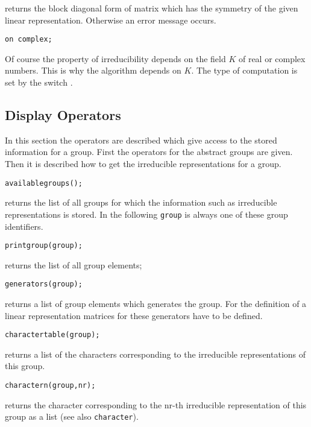 returns the block diagonal form of matrix which has the symmetry
of the given linear representation. Otherwise an error message occurs.

\texttt{on complex;}

Of course the property of irreducibility depends on the field $K$ of
real or complex numbers. This is why the algorithm depends on $K$.
The type of computation is set by the switch .

\subsection{Display Operators}
\hypertarget{operator:AVAILABLEGROUPS}{}
\hypertarget{operator:PRINTGROUP}{}
\hypertarget{operator:GENERATORS}{}
\hypertarget{operator:CHARACTERTABLE}{}
\hypertarget{operator:CHARACTERN}{}
\hypertarget{operator:IRREDUCIBLEREPTABLE}{}
\hypertarget{operator:IRREDUCIBLEREPNR}{}

In this section the operators are described which give access to the
stored information for a group.
First the operators for the abstract groups are given.
Then it is described how to get the irreducible representations
for a group.

\texttt{availablegroups();}

returns the list of all groups for which the information such as
irreducible representations is stored. In the following \texttt{group}
is always one of these group identifiers.

\texttt{printgroup(group);}

returns the list of all group elements;

\texttt{generators(group);}

returns a list of group elements which generates the group. For the
definition of a linear representation matrices for these generators
have to be defined.

\texttt{charactertable(group);}

returns a list of the characters corresponding to the irreducible
representations of this group.

\texttt{charactern(group,nr);}

returns the character corresponding to the nr-th irreducible representation
of this group as a list (see also \texttt{character}).

